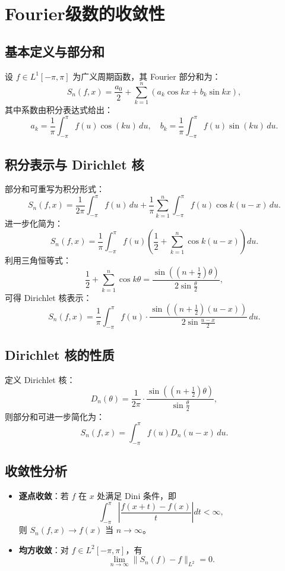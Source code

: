 \documentclass[12pt]{article}
\begin{document}
	\section{Fourier级数的收敛性}
	
	\subsection{基本定义与部分和}
	设 \( f \in L^1[-\pi, \pi] \) 为广义周期函数，其 Fourier 部分和为：
	\[
	S_n(f, x) = \frac{a_0}{2} + \sum_{k=1}^n \left( a_k \cos kx + b_k \sin kx \right),
	\]
	其中系数由积分表达式给出：
	\[
	a_k = \frac{1}{\pi} \int_{-\pi}^{\pi} f(u) \cos(ku) \, du, \quad 
	b_k = \frac{1}{\pi} \int_{-\pi}^{\pi} f(u) \sin(ku) \, du.
	\]
	
	\subsection{积分表示与 Dirichlet 核}
	部分和可重写为积分形式：
	\[
	S_n(f, x) = \frac{1}{2\pi} \int_{-\pi}^{\pi} f(u) \, du + \frac{1}{\pi} \sum_{k=1}^n \int_{-\pi}^{\pi} f(u) \cos k(u-x) \, du.
	\]
	进一步化简为：
	\[
	S_n(f, x) = \frac{1}{\pi} \int_{-\pi}^{\pi} f(u) \left( \frac{1}{2} + \sum_{k=1}^n \cos k(u-x) \right) du.
	\]
	利用三角恒等式：
	\[
	\frac{1}{2} + \sum_{k=1}^n \cos k\theta = \frac{\sin\left( (n+\frac{1}{2})\theta \right)}{2 \sin \frac{\theta}{2}},
	\]
	可得 Dirichlet 核表示：
	\[
	S_n(f, x) = \frac{1}{\pi} \int_{-\pi}^{\pi} f(u) \cdot \frac{\sin\left( (n+\frac{1}{2})(u-x) \right)}{2 \sin \frac{u-x}{2}} \, du.
	\]
	
	\subsection{Dirichlet 核的性质}
	定义 Dirichlet 核：
	\[
	D_n(\theta) = \frac{1}{2\pi} \cdot \frac{\sin\left( (n+\frac{1}{2})\theta \right)}{\sin \frac{\theta}{2}},
	\]
	则部分和可进一步简化为：
	\[
	S_n(f, x) = \int_{-\pi}^{\pi} f(u) D_n(u-x) \, du.
	\]
	
	\subsection{收敛性分析}
	\begin{itemize}
		\item \textbf{逐点收敛}：若 \( f \) 在 \( x \) 处满足 Dini 条件，即
		\[
		\int_{-\pi}^{\pi} \left| \frac{f(x+t) - f(x)}{t} \right| dt < \infty,
		\]
		则 \( S_n(f, x) \to f(x) \) 当 \( n \to \infty \)。
		
		\item \textbf{均方收敛}：对 \( f \in L^2[-\pi, \pi] \)，有
		\[
		\lim_{n \to \infty} \| S_n(f) - f \|_{L^2} = 0.
		\]
	\end{itemize}
	
\end{document}
